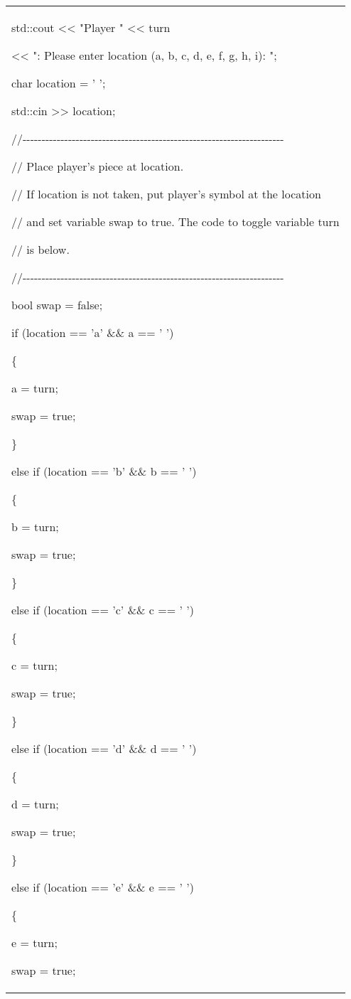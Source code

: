 \documentclass[
]{article}
\begin{document}
\begin{longtable}[]{@{}l@{}}
\begin{minipage}[t]{0.97\columnwidth}
std::cout \textless\textless{} "Player " \textless\textless{} turn

\textless\textless{} ": Please enter location (a, b, c, d, e, f, g, h,
i): ";

char location = ' ';

std::cin \textgreater\textgreater{} location;

//-\/-\/-\/-\/-\/-\/-\/-\/-\/-\/-\/-\/-\/-\/-\/-\/-\/-\/-\/-\/-\/-\/-\/-\/-\/-\/-\/-\/-\/-\/-\/-\/-\/-\/-\/-\/-\/-\/-\/-\/-\/-\/-\/-\/-\/-\/-\/-\/-\/-\/-\/-\/-\/-\/-\/-\/-\/-\/-\/-\/-\/-\/-\/-\/-\/-\/-\/-\/-

// Place player's piece at location.

// If location is not taken, put player's symbol at the location

// and set variable swap to true. The code to toggle variable turn

// is below.

//-\/-\/-\/-\/-\/-\/-\/-\/-\/-\/-\/-\/-\/-\/-\/-\/-\/-\/-\/-\/-\/-\/-\/-\/-\/-\/-\/-\/-\/-\/-\/-\/-\/-\/-\/-\/-\/-\/-\/-\/-\/-\/-\/-\/-\/-\/-\/-\/-\/-\/-\/-\/-\/-\/-\/-\/-\/-\/-\/-\/-\/-\/-\/-\/-\/-\/-\/-\/-

bool swap = false;

if (location == 'a' \&\& a == ' ')

\{

a = turn;

swap = true;

\}

else if (location == 'b' \&\& b == ' ')

\{

b = turn;

swap = true;

\}

else if (location == 'c' \&\& c == ' ')

\{

c = turn;

swap = true;

\}

else if (location == 'd' \&\& d == ' ')

\{

d = turn;

swap = true;

\}

else if (location == 'e' \&\& e == ' ')

\{

e = turn;

swap = true;


\end{minipage}
\end{longtable}
\end{document}
